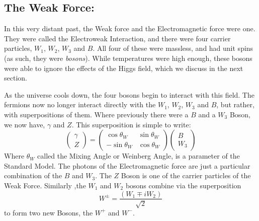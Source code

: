 \subsection{The Weak Force:}
In this very distant past, the Weak force and the Electromagnetic force were one. They were called the Electroweak Interaction, and there were four carrier particles, $W_1$, $W_2$, $W_3$ and $B$. All four of these were massless, and had unit spins (as such, they were \textit{bosons}). While temperatures were high enough, these bosons were able to ignore the effects of the Higgs field, which we discuss in the next section.

As the universe cools down, the four bosons begin to interact with this field. The fermions now no longer interact directly with the $W_1$, $W_2$, $W_3$ and $B$, but rather, with superpositions of them. Where previously there were a $B$ and a $W_3$ Boson, we now have, $\gamma$ and $Z$. This superposition is simple to write:
\begin{equation}
    \left( \begin{array}{c} \gamma \\ Z \end{array} \right) = \left( \begin{array}{c} \cos\theta_W \\ -\sin\theta_W \end{array} \begin{array}{c} \sin\theta_W \\ \cos\theta_W \end{array} \right) \left( \begin{array}{c} B \\ W_3 \end{array} \right)
\end{equation}
Where $\theta_W$ called the Mixing Angle or Weinberg Angle, is a parameter of the Standard Model. The photons of the Electromagnetic force are just a particular combination of the $B$ and $W_3$. The $Z$ Boson is one of the carrier particles of the Weak Force. Similarly ,the $W_1$ and $W_2$ bosons combine via the superposition
\begin{equation}
    W^\pm = \frac{(W_1\mp iW_2)}{\sqrt{2}}
\end{equation}
to form two new Bosons, the $W^+$ and $W^-$. 

